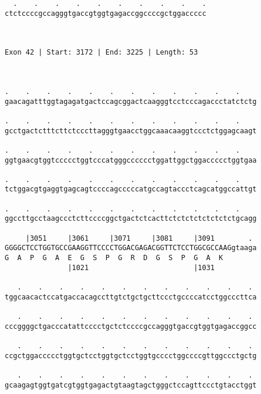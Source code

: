 \documentclass{article}
\begin{document}
\begin{Verbatim}
  .    .    .    .    .    .    .    .    .    .
ctctccccgccagggtgaccgtggtgagaccggccccgctggaccccc
                                                
                                                
 
Exon 42 | Start: 3172 | End: 3225 | Length: 53



.    .    .    .    .    .    .    .    .    .    .    .    
gaacagatttggtagagatgactccagcggactcaagggtcctcccagaccctatctctg
                                                            
.    .    .    .    .    .    .    .    .    .    .    .    
gcctgactctttcttctcccttagggtgaacctggcaaacaaggtccctctggagcaagt
                                                            
.    .    .    .    .    .    .    .    .    .    .    .    
ggtgaacgtggtccccctggtcccatgggcccccctggattggctggaccccctggtgaa
                                                            
.    .    .    .    .    .    .    .    .    .    .    .    
tctggacgtgaggtgagcagtccccagcccccatgccagtaccctcagcatggccattgt
                                                            
.    .    .    .    .    .    .    .    .    .    .    .    
ggccttgcctaagccctcttccccggctgactctcacttctctctctctctctctgcagg
                                                            
     |3051     |3061     |3071     |3081     |3091        . 
GGGGCTCCTGGTGCCGAAGGTTCCCCTGGACGAGACGGTTCTCCTGGCGCCAAGgtaaga
G  A  P  G  A  E  G  S  P  G  R  D  G  S  P  G  A  K        
               |1021                         |1031          
  
   .    .    .    .    .    .    .    .    .    .    .    . 
tggcaacactccatgaccacagccttgtctgctgcttccctgccccatcctggcccttca
                                                            
   .    .    .    .    .    .    .    .    .    .    .    . 
cccggggctgacccatattcccctgctctccccgccagggtgaccgtggtgagaccggcc
                                                            
   .    .    .    .    .    .    .    .    .    .    .    . 
ccgctggaccccctggtgctcctggtgctcctggtgcccctggccccgttggccctgctg
                                                            
   .    .    .    .    .    .    .    .    .    .    .    . 
gcaagagtggtgatcgtggtgagactgtaagtagctgggctccagttccctgtacctggt
                                                            

\end{Verbatim}
\end{document}

